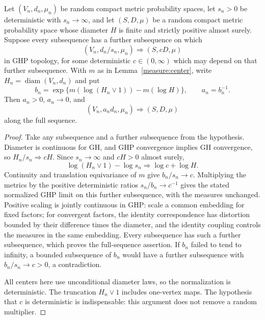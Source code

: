 \begin{lemma}
\label{measure:normalization}
Let $(V_n,d_n,\mu_n)$ be random compact metric probability spaces, let
$s_n>0$ be deterministic with $s_n\to\infty$, and let $(S,D,\mu)$ be a random
compact metric probability space whose diameter $H$ is finite and
strictly positive almost surely. Suppose every subsequence has a
further subsequence on which
\[
                 (V_n,d_n/s_n,\mu_n)\Longrightarrow(S,cD,\mu)
\]
in GHP topology, for some deterministic $c\in(0,\infty)$ which may
depend on that further subsequence. With $m$ as in Lemma~\ref{measure:center},
write $H_n=\operatorname{diam}(V_n,d_n)$ and put
\[
 b_n=\exp\{m(\log(H_n\vee1))-m(\log H)\},\qquad a_n=b_n^{-1}.
\]
Then $a_n>0$, $a_n\to0$, and
\[
                  (V_n,a_nd_n,\mu_n)\Longrightarrow(S,D,\mu)
\]
along the full sequence.
\end{lemma}
\begin{proof}
Take any subsequence and a further subsequence from the hypothesis.
Diameter is continuous for GH, and GHP convergence implies GH
convergence, so $H_n/s_n\Rightarrow cH$. Since $s_n\to\infty$ and
$cH>0$ almost surely,
\[
 \log(H_n\vee1)-\log s_n\Rightarrow\log c+\log H.
\]
Continuity and translation equivariance of $m$ give $b_n/s_n\to c$.
Multiplying the metrics by the positive deterministic ratios
$s_n/b_n\to c^{-1}$ gives the stated normalized GHP limit on this
further subsequence, with the measures unchanged. Positive scaling is
jointly continuous in GHP: scale a common embedding for fixed factors;
for convergent factors, the identity correspondence has distortion
bounded by their difference times the diameter, and the identity
coupling controls the measures in the same embedding.
Every subsequence has such a further subsequence, which proves the
full-sequence assertion. If $b_n$ failed to tend to infinity, a bounded
subsequence of $b_n$ would have a further subsequence with
$b_n/s_n\to c>0$, a contradiction.

All centers here use unconditional diameter laws, so the normalization
is deterministic. The truncation $H_n\vee1$ includes one-vertex maps.
The hypothesis that $c$ is deterministic is indispensable: this
argument does not remove a random multiplier.
\end{proof}
